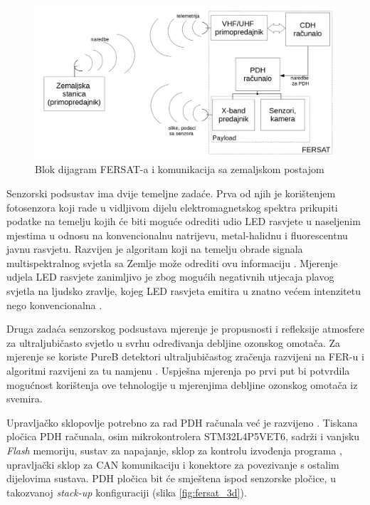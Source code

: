     \begin{figure}[htb]
        \centering
        \includegraphics[width=\textwidth]{slike/fersat_blok_dijagram.png}
        \caption{Blok dijagram FERSAT-a i komunikacija sa zemaljskom postajom \cite{diplomski_goran_petrak}}
        \label{fig:fersat_blok}
    \end{figure}

    Senzorski podsustav ima dvije temeljne zadaće. Prva od njih je korištenjem fotosenzora koji rade u vidljivom dijelu elektromagnetskog spektra prikupiti podatke na temelju kojih će biti moguće odrediti udio LED rasvjete u naseljenim mjestima u odnosu na konvencionalnu natrijevu, metal-halidnu i fluorescentnu javnu rasvjetu. Razvijen je algoritam koji na temelju obrade signala multispektralnog svjetla sa Zemlje može odrediti ovu informaciju \cite{diplomski_jakov_tutavac}. Mjerenje udjela LED rasvjete zanimljivo je zbog mogućih negativnih utjecaja plavog svjetla na ljudsko zravlje, kojeg LED rasvjeta emitira u znatno većem intenzitetu nego konvencionalna \cite{falchi_light_pollution}.

    Druga zadaća senzorskog podsustava mjerenje je propusnosti i refleksije atmosfere za ultraljubičasto svjetlo u svrhu određivanja debljine ozonskog omotača. Za mjerenje se koriste PureB detektori ultraljubičastog zračenja razvijeni na FER-u \cite{diplomski_filip_bogdanovic} i algoritmi razvijeni za tu namjenu \cite{zavrsni_kristian_stepancic}. Uspješna mjerenja po prvi put bi potvrdila mogućnost korištenja ove tehnologije u mjerenjima debljine ozonskog omotača iz svemira.

    Upravljačko sklopovlje potrebno za rad PDH računala već je razvijeno \cite{zavrsni_filip_juric}. Tiskana pločica PDH računala, osim mikrokontrolera STM32L4P5VET6, sadrži i vanjsku \textit{Flash} memoriju, sustav za napajanje, sklop za kontrolu izvođenja programa , upravljački sklop za CAN komunikaciju i konektore za povezivanje s ostalim dijelovima sustava. PDH pločica bit će smještena ispod senzorske pločice, u takozvanoj \textit{stack-up} konfiguraciji (slika \ref{fig:fersat_3d}).

